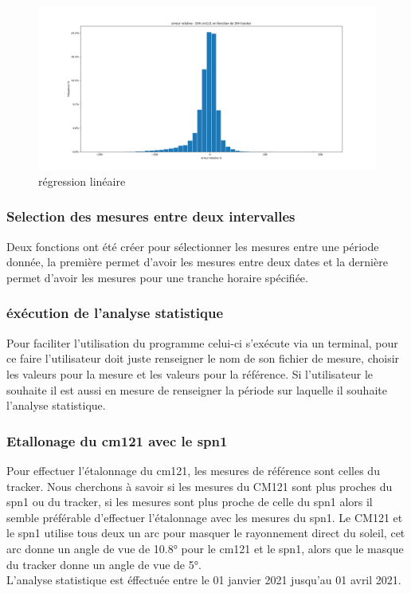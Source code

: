\documentclass[12pt,a4paper]{article}
\begin{document}
\begin{flushleft}
\begin{figure}[H]
\centering
\includegraphics[width=15cm]{image/histogramme/2.png}  
\caption{régression linéaire}  
\end{figure}

\subsubsection{Selection des mesures entre deux intervalles}

Deux fonctions ont été créer pour sélectionner les mesures entre une période donnée, la première permet d'avoir les mesures entre deux dates et la dernière permet d'avoir les mesures pour une tranche horaire spécifiée.

\subsubsection{éxécution de l'analyse statistique}

Pour faciliter l'utilisation du programme celui-ci s'exécute via un terminal, pour ce faire l'utilisateur doit juste renseigner le nom de son fichier de mesure, choisir les valeurs pour la mesure et les valeurs pour la référence. Si l'utilisateur le souhaite il est aussi en mesure de renseigner la période sur laquelle il souhaite l'analyse statistique.


\subsubsection{Etallonage du cm121 avec le spn1}

Pour effectuer l'étalonnage du cm121, les mesures de référence sont celles du tracker. Nous cherchons à savoir si les mesures du CM121 sont plus proches du spn1 ou du tracker, si les mesures sont plus proche de celle du spn1 alors il semble préférable d'effectuer l'étalonnage avec les mesures du spn1. Le CM121 et le spn1 utilise tous deux un arc pour masquer le rayonnement direct du soleil, cet arc donne un angle de vue de 10.8° pour le cm121 et le spn1, alors que le masque du tracker donne un angle de vue de 5°.\\
L'analyse statistique est éffectuée entre le 01 janvier 2021 jusqu'au 01 avril 2021.


\end{flushleft}
\end{document}
